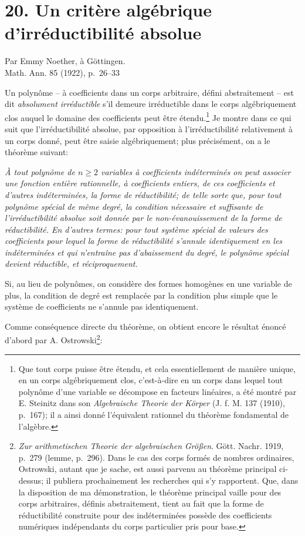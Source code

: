 \documentclass[11pt]{article}
\begin{document}
\fi


\setcounter{footnote}{0}
\section*{20. Un critère algébrique d'irréductibilité absolue}
\begin{center}
Par Emmy Noether, à Göttingen.\\[0.6em]
Math. Ann. 85 (1922), p.~26--33
\end{center}

Un polynôme -- à coefficients dans un corps arbitraire, défini abstraitement -- est dit \emph{absolument irréductible} s'il demeure irréductible dans le corps algébriquement clos auquel le domaine des coefficients peut être étendu.\footnote{Que tout corps puisse être étendu, et cela essentiellement de manière unique, en un corps algébriquement clos, c'est-à-dire en un corps dans lequel tout polynôme d'une variable se décompose en facteurs linéaires, a été montré par E. Steinitz dans son \emph{Algebraische Theorie der Körper} (J. f. M. 137 (1910), p.~167); il a ainsi donné l'équivalent rationnel du théorème fondamental de l'algèbre.} Je montre dans ce qui suit que l'irréductibilité absolue, par opposition à l'irréductibilité relativement à un corps donné, peut être saisie algébriquement; plus précisément, on a le théorème suivant:

\emph{À tout polynôme de $n\ge2$ variables à coefficients indéterminés on peut associer une fonction entière rationnelle, à coefficients entiers, de ces coefficients et d'autres indéterminées, la forme de réductibilité; de telle sorte que, pour tout polynôme spécial de même degré, la condition nécessaire et suffisante de l'irréductibilité absolue soit donnée par le non-évanouissement de la forme de réductibilité. En d'autres termes: pour tout système spécial de valeurs des coefficients pour lequel la forme de réductibilité s'annule identiquement en les indéterminées et qui n'entraîne pas d'abaissement du degré, le polynôme spécial devient réductible, et réciproquement.}

Si, au lieu de polynômes, on considère des formes homogènes en une variable de plus, la condition de degré est remplacée par la condition plus simple que le système de coefficients ne s'annule pas identiquement.

Comme conséquence directe du théorème, on obtient encore le résultat énoncé d'abord par A. Ostrowski\footnote{\emph{Zur arithmetischen Theorie der algebraischen Größen}. Gött. Nachr. 1919, p.~279 (lemme, p.~296). Dans le cas des corps formés de nombres ordinaires, Ostrowski, autant que je sache, est aussi parvenu au théorème principal ci-dessus; il publiera prochainement les recherches qui s'y rapportent. Que, dans la disposition de ma démonstration, le théorème principal vaille pour des corps arbitraires, définis abstraitement, tient au fait que la forme de réductibilité construite pour des indéterminées possède des coefficients numériques indépendants du corps particulier pris pour base.}:
\end{document}
